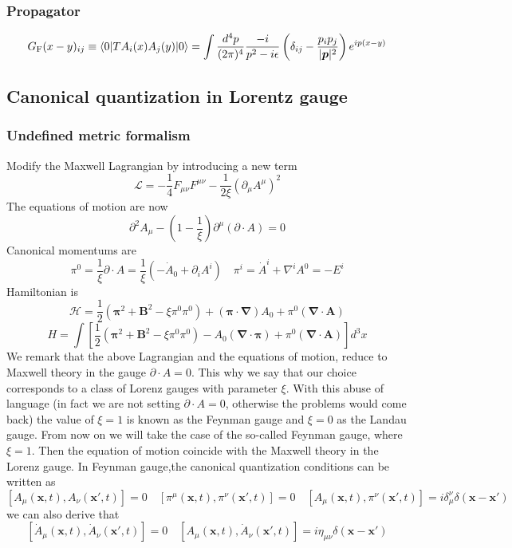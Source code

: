 \subsubsection{Propagator}
\[G_{\rm F}(x-y)_{ij} \equiv \langle 0 |T A_i(x) A_j(y) | 0 \rangle = \int \frac{d^4p}{(2\pi)^4} \frac{-i}{p^2-i\epsilon} \left(\delta_{ij} - \frac{p_ip_j}{|\bm{p}|^2}\right) e^{ip(x-y)}\]

\subsection{Canonical quantization in Lorentz gauge}
\subsubsection{Undefined metric formalism}
Modify the Maxwell Lagrangian by introducing a new term
\[\mathcal{L} = -\frac{1}{4} F_{\mu\nu}F^{\mu\nu} - \frac{1}{2\xi} (\partial_{\mu} A^{\mu})^2\]
The equations of motion are now
\[\partial^2 A_{\mu} - (1-\frac{1}{\xi})\partial^{\mu}(\partial \cdot A) = 0\]
Canonical momentums are
\[\pi^0 = \frac{1}{\xi} \partial \cdot A = \frac{1}{\xi}(-\dot{A}_0 + \partial_i A^i) \quad \pi^i = \dot{A}^i + \nabla^i A^0 = -E^i\]
Hamiltonian is
\[\mathcal{H} = \frac{1}{2}(\bm{\pi}^2 + \bm{B}^2 - \xi \pi^0 \pi^0) + (\bm{\pi} \cdot \bm{\nabla}) A_0 + \pi^0 (\bm{\nabla} \cdot \bm{A})\]
\[H =  \int \left[ \frac{1}{2}(\bm{\pi}^2 + \bm{B}^2 - \xi \pi^0 \pi^0) -A_0(\bm{\nabla} \cdot \bm{\pi}) + \pi^0 (\bm{\nabla} \cdot \bm{A}) \right] d^3x \]
We remark that the above Lagrangian and the equations of motion, reduce to Maxwell theory in the gauge $\partial \cdot A = 0$. This why we say that our choice corresponds to a class of Lorenz gauges with parameter $\xi$. With this abuse of language (in fact we are not setting $\partial \cdot A = 0$, otherwise the problems would come back) the value of $\xi=1$ is known as the Feynman gauge and $\xi=0$ as the Landau gauge. From now on we will take the case of the so-called Feynman gauge, where $\xi=1$. Then the equation of motion coincide with the Maxwell theory in the Lorenz gauge. In Feynman gauge,the canonical quantization conditions can be written as
\[[A_{\mu}(\bm{x},t),A_{\nu}(\bm{x}',t)] = 0 \quad [\pi^{\mu}(\bm{x},t),\pi^{\nu}(\bm{x}',t)] = 0 \quad [A_{\mu}(\bm{x},t),\pi^{\nu}(\bm{x}',t)] = i\delta^{\nu}_{\mu} \delta(\bm{x}-\bm{x}')\]
we can also derive that
\[[\dot{A}_{\mu}(\bm{x},t),\dot{A}_{\nu}(\bm{x}',t)] = 0 \quad [A_{\mu}(\bm{x},t),\dot{A}_{\nu}(\bm{x}',t)] = i\eta_{\mu\nu} \delta(\bm{x}-\bm{x}')\]

